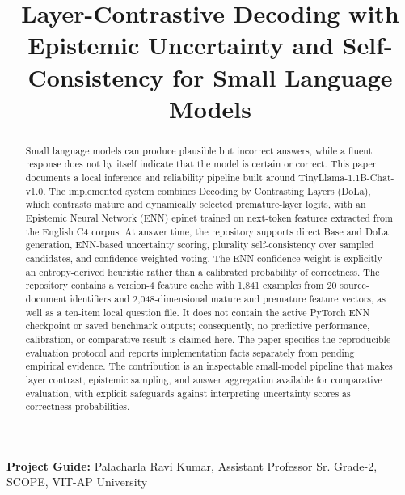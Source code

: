 \documentclass[conference]{IEEEtran}
\begin{document}
\title{Layer-Contrastive Decoding with Epistemic Uncertainty and Self-Consistency for Small Language Models}

\author{
}

\maketitle

\begin{center}\small\textbf{Project Guide:} Palacharla Ravi Kumar, Assistant Professor Sr. Grade-2, SCOPE, VIT-AP University\end{center}

\begin{abstract}
Small language models can produce plausible but incorrect answers, while a fluent response does not by itself indicate that the model is certain or correct. This paper documents a local inference and reliability pipeline built around TinyLlama-1.1B-Chat-v1.0. The implemented system combines Decoding by Contrasting Layers (DoLa), which contrasts mature and dynamically selected premature-layer logits, with an Epistemic Neural Network (ENN) epinet trained on next-token features extracted from the English C4 corpus. At answer time, the repository supports direct Base and DoLa generation, ENN-based uncertainty scoring, plurality self-consistency over sampled candidates, and confidence-weighted voting. The ENN confidence weight is explicitly an entropy-derived heuristic rather than a calibrated probability of correctness. The repository contains a version-4 feature cache with 1,841 examples from 20 source-document identifiers and 2,048-dimensional mature and premature feature vectors, as well as a ten-item local question file. It does not contain the active PyTorch ENN checkpoint or saved benchmark outputs; consequently, no predictive performance, calibration, or comparative result is claimed here. The paper specifies the reproducible evaluation protocol and reports implementation facts separately from pending empirical evidence. The contribution is an inspectable small-model pipeline that makes layer contrast, epistemic sampling, and answer aggregation available for comparative evaluation, with explicit safeguards against interpreting uncertainty scores as correctness probabilities.
\end{abstract}
\end{document}

